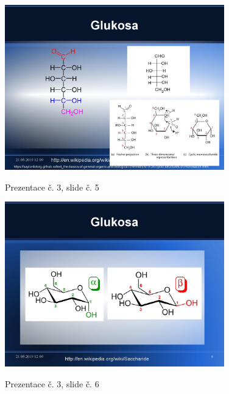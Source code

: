 \documentclass[DIV=8]{scrreprt}
\begin{document}
\begin{figure}
    \caption{Prezentace č. 3, slide č. 5}
    \includegraphics[width=0.85\textwidth]{slides-3/slide-5.jpg}
    \centering
    \label{slides-3-slide-5}
\end{figure}
\begin{figure}
    \caption{Prezentace č. 3, slide č. 6}
    \includegraphics[width=0.85\textwidth]{slides-3/slide-6.jpg}
    \centering
    \label{slides-3-slide-6}
\end{figure}
\end{document}
